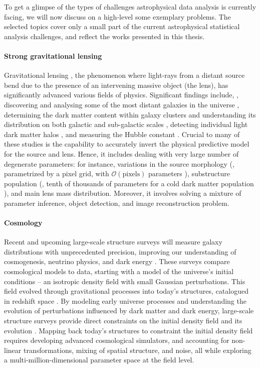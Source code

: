 To get a glimpse of the types of challenges astrophysical data analysis is currently facing, we will now discuss on a high-level some exemplary problems. The selected topics cover only a small part of the current astrophysical statistical analysis challenges, and reflect the works presented in this thesis.

\paragraph{Strong gravitational lensing}
Gravitational lensing \cite{Meneghetti:2016aa}, the phenomenon where light-rays from a distant source bend due to the presence of an intervening massive object (the lens), has significantly advanced various fields of physics. Significant findings include, \eg, discovering and analysing some of the most distant galaxies in the universe \cite[\eg][]{Zitrin_2015, Naidu_2022, Treu_2015}, determining the dark matter content within galaxy clusters and understanding its distribution on both galactic and sub-galactic scales \cite[\eg][]{Dalal:2001fq, Vegetti:2014lqa, Gilman:2019nap, Hsueh:2019ynk, Nightingale:2014aa}, detecting individual light dark matter halos \cite[\eg][]{Vegetti:2009cz, Vegetti:2012mc, Hezaveh:2016ltk}, and measuring the Hubble constant \cite[\eg][]{Suyu_2020, Birrer_2020}. Crucial to many of these studies is the capability to accurately invert the physical predictive model for the source and lens. Hence, it includes dealing with very large number of degenerate parameters: for instance, variations in the source morphology (\eg, parametrized by a pixel grid, with $\mathcal{O}(\text{pixels})$ parameters \cite[\eg][]{Karchev:2021fro}), substructure population (\eg, tenth of thousands of parameters for a cold dark matter population \cite[\eg][]{Montel:2022fhv}), and main lens mass distribution. Moreover, it involves solving a mixture of parameter inference, object detection, and image reconstruction problem.
        
\paragraph{Cosmology}
Recent and upcoming large-scale structure surveys will measure galaxy distributions with unprecedented precision, improving our understanding of cosmogenesis, neutrino physics, and dark energy \cite[\eg][]{LSSTDarkEnergyScience:2012kar, EUCLID:2011zbd}. These surveys compare cosmological models to data, starting with a model of the universe's initial conditions -- an isotropic density field with small Gaussian perturbations. This field evolved through gravitational processes into today's structures, catalogued in redshift space \cite{Bond:1995yt}. By modeling early universe processes and understanding the evolution of perturbations influenced by dark matter and dark energy, large-scale structure surveys provide direct constraints on the initial density field and its evolution \cite{Jasche:2012kq}. Mapping back today's structures to constraint the initial density field requires developing advanced cosmological simulators, and accounting for non-linear transformations, mixing of spatial structure, and noise, all while exploring a multi-million-dimensional parameter space at the field level.
      
